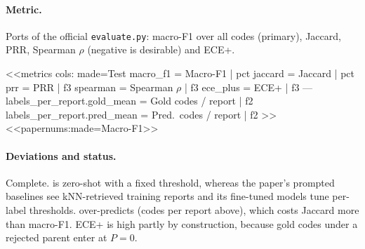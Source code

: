 \paragraph{Metric.} Ports of the official \texttt{evaluate.py}: macro-F1 over all codes (primary), Jaccard, PRR,
Spearman $\rho$ (negative is desirable) and ECE+.

<<metrics
cols: made=Test
macro_f1 = Macro-F1 | pct
jaccard = Jaccard | pct
prr = PRR | f3
spearman = Spearman $\rho$ | f3
ece_plus = ECE+ | f3
---
labels_per_report.gold_mean = Gold codes / report | f2
labels_per_report.pred_mean = Pred.\ codes / report | f2
>>
<<papernums:made=Macro-F1>>

\paragraph{Deviations and status.} Complete. \jev{} is zero-shot with a fixed threshold, whereas the paper's prompted
baselines see kNN-retrieved training reports and its fine-tuned models tune per-label thresholds. \jev{}
over-predicts (codes per report above), which costs Jaccard more than macro-F1. ECE+ is high partly by construction,
because gold codes under a rejected parent enter at $P=0$.
